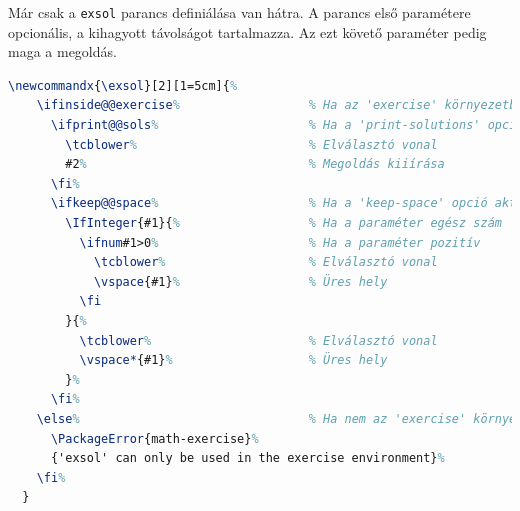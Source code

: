 Már csak a \texttt{exsol} parancs definiálása van hátra. A parancs első
paramétere opcionális, a kihagyott távolságot tartalmazza. Az ezt követő
paraméter pedig maga a megoldás.

\begin{lstlisting}[language=tex,caption={Az \texttt{exsol} parancs}]
  \newcommandx{\exsol}[2][1=5cm]{%
    \ifinside@@exercise%                  % Ha az 'exercise' környezetben vagyunk
      \ifprint@@sols%                     % Ha a 'print-solutions' opció aktív
        \tcblower%                        % Elválasztó vonal
        #2%                               % Megoldás kiiírása
      \fi%
      \ifkeep@@space%                     % Ha a 'keep-space' opció aktív
        \IfInteger{#1}{%                  % Ha a paraméter egész szám
          \ifnum#1>0%                     % Ha a paraméter pozitív
            \tcblower%                    % Elválasztó vonal
            \vspace{#1}%                  % Üres hely
          \fi
        }{%
          \tcblower%                      % Elválasztó vonal
          \vspace*{#1}%                   % Üres hely
        }%
      \fi%
    \else%                                % Ha nem az 'exercise' környezetben vagyunk
      \PackageError{math-exercise}%
      {'exsol' can only be used in the exercise environment}%
    \fi%
  }
\end{lstlisting}

